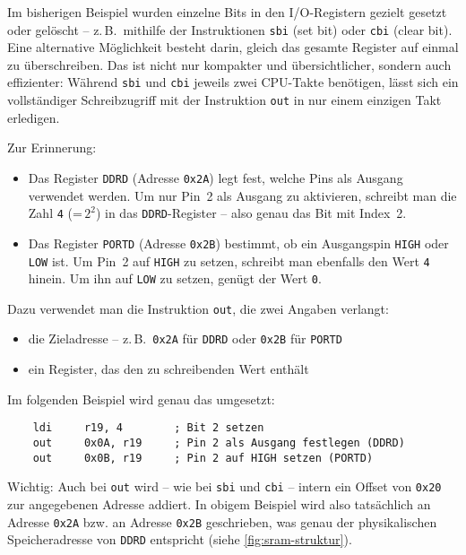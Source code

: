 \documentclass[a4paper,12pt]{article}
\begin{document}
Im bisherigen Beispiel wurden einzelne Bits in den I/O-Registern gezielt
gesetzt oder gelöscht – z.\,B.\ mithilfe der Instruktionen \texttt{sbi} (set
bit) oder \texttt{cbi} (clear bit).  Eine alternative Möglichkeit besteht
darin, gleich das gesamte Register auf einmal zu überschreiben. Das ist nicht
nur kompakter und übersichtlicher, sondern auch effizienter: Während
\texttt{sbi} und \texttt{cbi} jeweils zwei CPU-Takte benötigen, lässt sich ein
vollständiger Schreibzugriff mit der Instruktion \texttt{out} in nur einem
einzigen Takt erledigen.

\medskip
\noindent
Zur Erinnerung:
\begin{itemize}
    \item
	Das Register \texttt{DDRD} (Adresse \texttt{0x2A}) legt fest, welche
	Pins als Ausgang verwendet werden. Um nur Pin~2 als Ausgang zu
	aktivieren, schreibt man die Zahl \texttt{4} (= $2^2$) in das
	\texttt{DDRD}-Register – also genau das Bit mit Index~2.
    \item
	Das Register \texttt{PORTD} (Adresse \texttt{0x2B}) bestimmt, ob ein
	Ausgangspin \texttt{HIGH} oder \texttt{LOW} ist. Um Pin~2 auf
	\texttt{HIGH} zu setzen, schreibt man ebenfalls den Wert \texttt{4}
	hinein. Um ihn auf \texttt{LOW} zu setzen, genügt der Wert \texttt{0}.
\end{itemize}

\medskip
\noindent
Dazu verwendet man die Instruktion \texttt{out}, die zwei Angaben verlangt:
\begin{itemize}
    \item
	die Zieladresse – z.\,B.\ \texttt{0x2A} für \texttt{DDRD} oder
	\texttt{0x2B} für \texttt{PORTD}
    \item
	ein Register, das den zu schreibenden Wert enthält
\end{itemize}
Im folgenden Beispiel wird genau das umgesetzt:
\begin{lstlisting}
    ldi     r19, 4        ; Bit 2 setzen
    out     0x0A, r19     ; Pin 2 als Ausgang festlegen (DDRD)
    out     0x0B, r19     ; Pin 2 auf HIGH setzen (PORTD)
\end{lstlisting}


\noindent
Wichtig: Auch bei \texttt{out} wird – wie bei \texttt{sbi} und \texttt{cbi} –
intern ein Offset von \texttt{0x20} zur angegebenen Adresse addiert. In
obigem Beispiel wird also tatsächlich an Adresse \texttt{0x2A} bzw. an Adresse
\texttt{0x2B} geschrieben, was genau der physikalischen Speicheradresse von
\texttt{DDRD} entspricht (siehe \autoref{fig:sram-struktur}).
\end{document}
